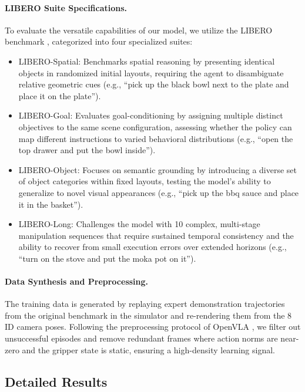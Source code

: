 \documentclass{llmxive}
\begin{document}
\paragraph{LIBERO Suite Specifications.} 
To evaluate the versatile capabilities of our model, we utilize the LIBERO benchmark \cite{liu2023libero}, categorized into four specialized suites:
\begin{itemize} [itemsep=0.3em, topsep=0.5em]
    \item LIBERO-Spatial: Benchmarks spatial reasoning by presenting identical objects in randomized initial layouts, requiring the agent to disambiguate relative geometric cues (e.g., ``pick up the black bowl next to the plate and place it on the plate'').
    \item LIBERO-Goal: Evaluates goal-conditioning by assigning multiple distinct objectives to the same scene configuration, assessing whether the policy can map different instructions to varied behavioral distributions (e.g., ``open the top drawer and put the bowl inside'').
    \item LIBERO-Object: Focuses on semantic grounding by introducing a diverse set of object categories within fixed layouts, testing the model's ability to generalize to novel visual appearances (e.g., ``pick up the bbq sauce and place it in the basket'').
    \item LIBERO-Long: Challenges the model with 10 complex, multi-stage manipulation sequences that require sustained temporal consistency and the ability to recover from small execution errors over extended horizons (e.g., ``turn on the stove and put the moka pot on it'').
\end{itemize}




\paragraph{Data Synthesis and Preprocessing.} 
The training data is generated by replaying expert demonstration trajectories from the original benchmark in the simulator and re-rendering them from the 8 ID camera poses. Following the preprocessing protocol of OpenVLA \cite{openvla}, we filter out unsuccessful episodes and remove redundant frames where action norms are near-zero and the gripper state is static, ensuring a high-density learning signal.





\subsection{Detailed Results}
\end{document}
